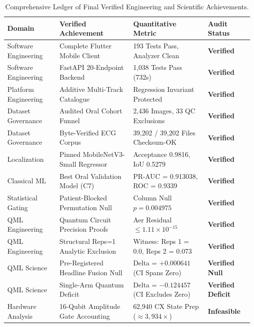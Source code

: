 \documentclass[11pt,a4paper]{report}
\begin{document}
\begin{table}[H]
\centering
\small
\begin{tabularx}{\textwidth}{lXll}
\toprule
\textbf{Domain} & \textbf{Verified Achievement} & \textbf{Quantitative Metric} & \textbf{Audit Status} \\
\midrule
Software Engineering & Complete Flutter Mobile Client & 193 Tests Pass, Analyzer Clean & \textbf{Verified} \\
Software Engineering & FastAPI 20-Endpoint Backend & 1,038 Tests Pass (732s) & \textbf{Verified} \\
Platform Engineering & Additive Multi-Track Catalogue & Regression Invariant Protected & \textbf{Verified} \\
Dataset Governance & Audited Oral Cohort Funnel & 2,436 Images, 33 QC Exclusions & \textbf{Verified} \\
Dataset Governance & Byte-Verified ECG Corpus & 39,202 / 39,202 Files Checksum-OK & \textbf{Verified} \\
Localization & Pinned MobileNetV3-Small Regressor & Acceptance 0.9816, IoU 0.5279 & \textbf{Verified} \\
Classical ML & Best Oral Validation Model (C7) & PR-AUC = 0.913038, ROC = 0.9339 & \textbf{Verified} \\
Statistical Gating & Patient-Blocked Permutation Null & Column Null $p = 0.004975$ & \textbf{Verified} \\
QML Engineering & Quantum Circuit Precision Proofs & Aer Residual $\le 1.11 \times 10^{-15}$ & \textbf{Verified} \\
QML Engineering & Structural Reps=1 Analytic Exclusion & Witness: Reps 1 = 0.0, Reps 2 = 0.073 & \textbf{Verified} \\
QML Science & Pre-Registered Headline Fusion Null & Delta = $+0.000641$ (CI Spans Zero) & \textbf{Verified Null} \\
QML Science & Single-Arm Quantum Deficit & Delta = $-0.124457$ (CI Excludes Zero)& \textbf{Verified Deficit} \\
Hardware Analysis & 16-Qubit Amplitude Gate Accounting & 62,940 CX State Prep ($\approx 3,934\times$) & \textbf{Infeasible} \\
\bottomrule
\end{tabularx}
\caption{Comprehensive Ledger of Final Verified Engineering and Scientific Achievements.}
\label{tab:final_ledger}
\end{table}
\end{document}
